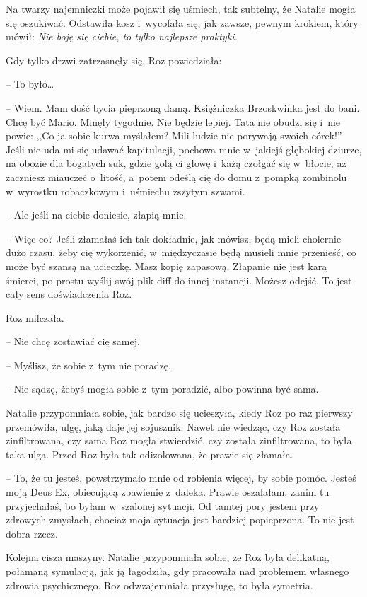 \documentclass[oneside,polish,11pt,sfheadings]{mwbk}
\begin{document}
Na twarzy najemniczki może pojawił się uśmiech, tak subtelny, że Natalie
mogła się oszukiwać. Odstawiła kosz i~wycofała się, jak zawsze, pewnym
krokiem, który mówił: \textit{Nie boję się ciebie, to tylko najlepsze
praktyki.}

Gdy tylko drzwi zatrzasnęły się, Roz powiedziała: 

-- To było\ldots 

-- Wiem. Mam dość bycia pieprzoną damą. Księżniczka Brzoskwinka jest do
bani. Chcę być Mario. Minęły tygodnie. Nie będzie lepiej. Tata nie
obudzi się i~nie powie: ,,Co ja sobie kurwa myślałem? Mili ludzie nie
porywają swoich córek!'' Jeśli nie uda mi się udawać kapitulacji,
pochowa mnie w~jakiejś głębokiej dziurze, na obozie dla bogatych suk,
gdzie golą ci głowę i~każą czołgać się w~błocie, aż zaczniesz miauczeć o~litość, a~potem odeślą cię do domu z~pompką zombinolu w~wyrostku
robaczkowym i~uśmiechu zszytym szwami.

-- Ale jeśli na ciebie doniesie, złapią mnie.

-- Więc co? Jeśli złamałaś ich tak dokładnie, jak mówisz, będą mieli
cholernie dużo czasu, żeby cię wykorzenić, w~międzyczasie będą musieli
mnie przenieść, co może być szansą na ucieczkę. Masz kopię zapasową.
Złapanie nie jest karą śmierci, po prostu wyślij swój plik diff do innej
instancji. Możesz odejść. To jest cały sens doświadczenia Roz.

Roz milczała. 

-- Nie chcę zostawiać cię samej.

-- Myślisz, że sobie z~tym nie poradzę.

-- Nie sądzę, żebyś mogła sobie z~tym poradzić, albo powinna być sama.

Natalie przypomniała sobie, jak bardzo się ucieszyła, kiedy Roz po raz
pierwszy przemówiła, ulgę, jaką daje jej sojusznik. Nawet nie wiedząc,
czy Roz została zinfiltrowana, czy sama Roz mogła stwierdzić, czy
została zinfiltrowana, to była taka ulga. Przed Roz była tak
odizolowana, że prawie się złamała.

-- To, że tu jesteś, powstrzymało mnie od robienia więcej, by sobie
pomóc. Jesteś moją Deus Ex, obiecującą zbawienie z~daleka. Prawie
oszalałam, zanim tu przyjechałaś, bo byłam w~szalonej sytuacji. Od
tamtej pory jestem przy zdrowych zmysłach, chociaż moja sytuacja jest
bardziej popieprzona. To nie jest dobra rzecz.

Kolejna cisza maszyny. Natalie przypomniała sobie, że Roz była
delikatną, połamaną symulacją, jak ją łagodziła, gdy pracowała nad
problemem własnego zdrowia psychicznego. Roz odwzajemniała przysługę, to
była symetria.
\end{document}
